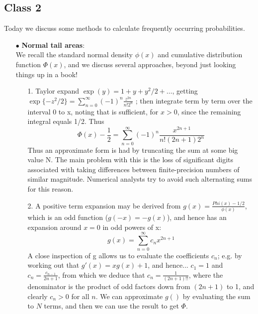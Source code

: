 \documentclass[11pt,a4paper]{article}
\begin{document}
\subsection*{Class 2}
Today we discuss some methods to calculate frequently occurring probabilities.  \\
\begin{itemize}
\item[$\bullet$] \textbf{Normal tail areas}:\\
We recall the standard normal density $\phi(x)$ and cumulative distribution function $\Phi(x)$, and we discuss several approaches, beyond just looking things up in a book!\\
\begin{enumerate}
\item[1.] Taylor expand  $\exp (y) = 1 + y + y^2/2 + \ldots$, getting  $\exp\{ -z^2/2 \} = \sum_{n=0}^\infty (-1)^n \frac{z^{2n}}{ n! 2^n }$ ; then integrate term by term over the interval 0 to x, noting that is sufficient, for $x > 0$, since the remaining integral equals 1/2.  Thus  
$$\Phi(x) - \frac{1}{2} = \sum_{n=0}^\infty (-1)^n \frac{x^{2n+1}}{n! (2n+1) 2^n }$$
Thus an approximate form is had by truncating the sum at some big value N.  The main problem with this is the loss of significant digits associated with taking differences between finite-precision numbers of similar magnitude.  Numerical analysts try to avoid such alternating sums for this reason.
\item[2.] A positive term expansion may be derived from $g(x) = \frac{Phi(x)-1/2}{\phi(x)}$, which is an odd function ($g(-x) = -g(x)$), and hence has an expansion around $x=0$ in odd powers of x:
$$g(x) = \sum_{n=0}^\infty c_n x^{2n+1}$$
A close inspection of g allows us to evaluate the coefficients $c_n$; e.g. by working out that $g'(x) = x g(x) + 1$, and hence... $c_1 = 1$ and $c_n = \frac{c_{n-1}}{2n+1}$, from which we deduce that $c_n = \frac{1}{(2n+1)!!}$, where the denominator is the product of odd factors down from $(2n+1)$ to 1, and clearly $c_n > 0$ for all $n$. We can approximate $g()$ by evaluating the sum to $N$ terms, and then we can use the result to get $\Phi$.
\end{enumerate}


\end{itemize}
\end{document}
